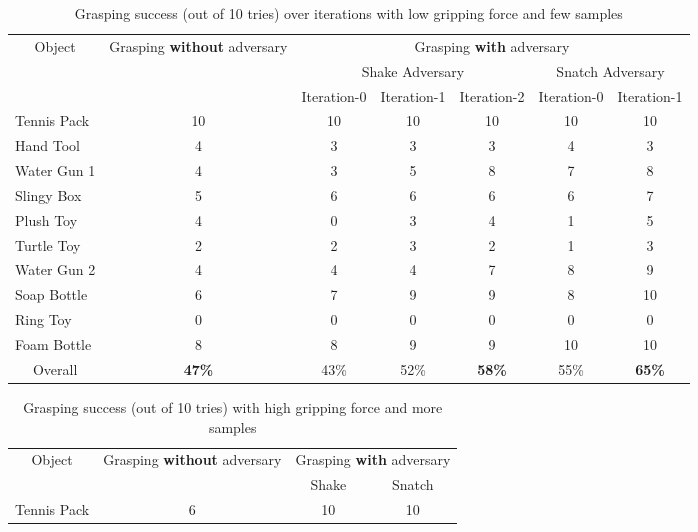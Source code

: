 \documentclass[letterpaper, 10 pt, conference]{ieeeconf}  %
\begin{document}
\begin{table*}[]
\centering
\caption{Grasping success (out of 10 tries) over iterations with low gripping force and few samples}
\label{tab:results_low}
\begin{tabular}{l|c|ccc|cc|}
\multicolumn{1}{c|}{\multirow{3}{*}{Object}} & \multicolumn{1}{c|}{\multirow{3}{*}{Grasping \textbf{without} adversary}} & \multicolumn{5}{c|}{Grasping \textbf{with} adversary} \\ \cline{3-7} 
\multicolumn{1}{c|}{} & \multicolumn{1}{c|}{} & \multicolumn{3}{c|}{Shake Adversary} & \multicolumn{2}{c|}{Snatch Adversary} \\ \cline{3-7} 
\multicolumn{1}{c|}{} & \multicolumn{1}{c|}{} & \multicolumn{1}{c}{Iteration-0} & \multicolumn{1}{c}{Iteration-1} & \multicolumn{1}{c|}{Iteration-2} & \multicolumn{1}{c}{Iteration-0} & \multicolumn{1}{c|}{Iteration-1} \\ \hline
Tennis Pack & 10 & 10 & 10 & 10 & 10 & 10 \\
Hand Tool & 4 & 3 & 3 & 3 & 4 & 3 \\
Water Gun 1 & 4 & 3 & 5 & 8 & 7 & 8 \\
Slingy Box & 5 & 6 & 6 & 6 & 6 & 7 \\
Plush Toy & 4 & 0 & 3 & 4 & 1 & 5 \\
Turtle Toy & 2 & 2 & 3 & 2 & 1 & 3 \\
Water Gun 2 & 4 & 4 & 4 & 7 & 8 & 9 \\
Soap Bottle & 6 & 7 & 9 & 9 & 8 & 10 \\
Ring Toy & 0 & 0 & 0 & 0 & 0 & 0 \\
Foam Bottle & 8 & 8 & 9 & 9 & 10 & 10 \\ \hline
\multicolumn{1}{c|}{Overall} & \textbf{47\%} & 43\% & 52\% & \textbf{58\%} & 55\% & \textbf{65\%}
\end{tabular}
\end{table*}\begin{table}[]
\centering
\caption{Grasping success (out of 10 tries) with high gripping force and more samples}
\label{tab:results_high}
\begin{tabular}{l|c|c|c|}
\multicolumn{1}{c|}{\multirow{2}{*}{Object}} & \multicolumn{1}{c|}{\multirow{2}{*}{Grasping \textbf{without} adversary}} & \multicolumn{2}{c|}{Grasping \textbf{with} adversary} \\ \cline{3-4} 
\multicolumn{1}{c|}{} & \multicolumn{1}{c|}{} & \multicolumn{1}{c|}{Shake} & \multicolumn{1}{c|}{Snatch} \\ \hline  
Tennis Pack  & 6 & 10 & 10 \\

\end{tabular}
\end{table}
\end{document}
